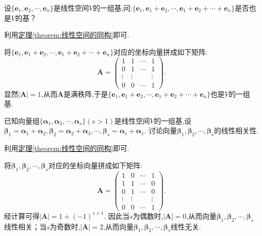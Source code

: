 \documentclass[lang=cn,newtx,10pt,scheme=chinese]{elegantbook}
\begin{document}
\begin{example}
设\(\{\boldsymbol{e}_1,\boldsymbol{e}_2,\cdots,\boldsymbol{e}_n\}\)是线性空间\(V\)的一组基,问:\(\{\boldsymbol{e}_1,\boldsymbol{e}_1+\boldsymbol{e}_2,\cdots,\boldsymbol{e}_1+\boldsymbol{e}_2+\cdots+\boldsymbol{e}_n\}\)是否也是\(V\)的基？
\end{example}
\begin{note}
利用\hyperref[theorem:线性空间的同构]{定理\ref{theorem:线性空间的同构}}即可.
\end{note}
\begin{solution}
将\(\{\boldsymbol{e}_1,\boldsymbol{e}_1+\boldsymbol{e}_2,\cdots,\boldsymbol{e}_1+\boldsymbol{e}_2+\cdots+\boldsymbol{e}_n\}\)对应的坐标向量拼成如下矩阵:
\[
\boldsymbol{A}=\begin{pmatrix}
1&1&\cdots&1\\
0&1&\cdots&1\\
\vdots&\vdots&&\vdots\\
0&0&\cdots&1
\end{pmatrix}.
\]
显然\(|\boldsymbol{A}| = 1\),从而\(\boldsymbol{A}\)是满秩阵,于是\(\{\boldsymbol{e}_1,\boldsymbol{e}_1+\boldsymbol{e}_2,\cdots,\boldsymbol{e}_1+\boldsymbol{e}_2+\cdots+\boldsymbol{e}_n\}\)也是\(V\)的一组基. 
\end{solution}

\begin{example}
已知向量组\(\{\boldsymbol{\alpha}_1,\boldsymbol{\alpha}_2,\cdots,\boldsymbol{\alpha}_s\}(s > 1)\)是线性空间\(V\)的一组基,设\(\boldsymbol{\beta}_1=\boldsymbol{\alpha}_1+\boldsymbol{\alpha}_2,\boldsymbol{\beta}_2=\boldsymbol{\alpha}_2+\boldsymbol{\alpha}_3,\cdots,\boldsymbol{\beta}_s=\boldsymbol{\alpha}_s+\boldsymbol{\alpha}_1\). 讨论向量\(\boldsymbol{\beta}_1,\boldsymbol{\beta}_2,\cdots,\boldsymbol{\beta}_s\)的线性相关性.
\end{example}
\begin{note}
利用\hyperref[theorem:线性空间的同构]{定理\ref{theorem:线性空间的同构}}即可.
\end{note}
\begin{solution}
将\(\boldsymbol{\beta}_1,\boldsymbol{\beta}_2,\cdots,\boldsymbol{\beta}_s\)对应的坐标向量拼成如下矩阵:
\[
\boldsymbol{A}=\begin{pmatrix}
1&0&\cdots&1\\
1&1&\cdots&0\\
0&1&\cdots&0\\
\vdots&\vdots&&\vdots\\
0&0&\cdots&1
\end{pmatrix}.
\]
经计算可得\(|\boldsymbol{A}| = 1+(-1)^{s + 1}\). 因此当\(s\)为偶数时,\(|\boldsymbol{A}| = 0\),从而向量\(\boldsymbol{\beta}_1,\boldsymbol{\beta}_2,\cdots,\boldsymbol{\beta}_s\)线性相关；当\(s\)为奇数时,\(|\boldsymbol{A}| = 2\),从而向量\(\boldsymbol{\beta}_1,\boldsymbol{\beta}_2,\cdots,\boldsymbol{\beta}_s\)线性无关. 
\end{solution}
\end{document}

